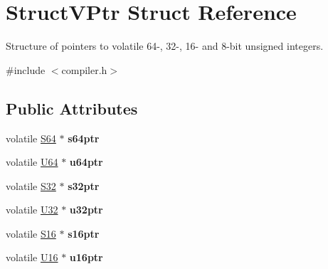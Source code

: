 \hypertarget{struct_struct_v_ptr}{\section{Struct\-V\-Ptr Struct Reference}
\label{struct_struct_v_ptr}
}


Structure of pointers to volatile 64-\/, 32-\/, 16-\/ and 8-\/bit unsigned integers.  




{\ttfamily \#include $<$compiler.\-h$>$}

\subsection*{Public Attributes}
\begin{DoxyCompactItemize}
\item 
\hypertarget{struct_struct_v_ptr_a8dc6099fe7124be876bb39ce2dbf0b4d}{volatile \hyperlink{group__group__xmega__utils_ga1d293e5c494dd6826239b02f5fe98e7f}{S64} $\ast$ {\bfseries s64ptr}}\label{struct_struct_v_ptr_a8dc6099fe7124be876bb39ce2dbf0b4d}

\item 
\hypertarget{struct_struct_v_ptr_a191528bcd3c8787294df254b8afe1cb0}{volatile \hyperlink{group__group__xmega__utils_ga25809e0734a149248fcf5831efa4e33d}{U64} $\ast$ {\bfseries u64ptr}}\label{struct_struct_v_ptr_a191528bcd3c8787294df254b8afe1cb0}

\item 
\hypertarget{struct_struct_v_ptr_a5077596b4a3f411d721d2acff828b229}{volatile \hyperlink{group__group__xmega__utils_ga39c786017723555afb9e8b85accec0de}{S32} $\ast$ {\bfseries s32ptr}}\label{struct_struct_v_ptr_a5077596b4a3f411d721d2acff828b229}

\item 
\hypertarget{struct_struct_v_ptr_a3e510b4e1ddc03e1f0a84200a4641dc6}{volatile \hyperlink{group__group__xmega__utils_ga696390429f2f3b644bde8d0322a24124}{U32} $\ast$ {\bfseries u32ptr}}\label{struct_struct_v_ptr_a3e510b4e1ddc03e1f0a84200a4641dc6}

\item 
\hypertarget{struct_struct_v_ptr_a14b9b38985dac215940243c4cfbbb4b0}{volatile \hyperlink{group__group__xmega__utils_ga6d241ad21a823c90d4835380787db5d4}{S16} $\ast$ {\bfseries s16ptr}}\label{struct_struct_v_ptr_a14b9b38985dac215940243c4cfbbb4b0}

\item 
\hypertarget{struct_struct_v_ptr_a0e59b9de39e5c22af91b5470fdb5aec4}{volatile \hyperlink{group__group__xmega__utils_ga0a0a322d5fa4a546d293a77ba8b4a71f}{U16} $\ast$ {\bfseries u16ptr}}\label{struct_struct_v_ptr_a0e59b9de39e5c22af91b5470fdb5aec4}


\end{DoxyCompactItemize}
